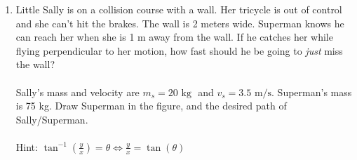 \documentclass[12pt]{report}
\newcommand{\kg}{\mbox{ kg }}
\begin{document}
\begin{enumerate}
\item Little Sally is on a collision course with a wall.  Her tricycle is out of control and she can't hit the brakes.  The wall is 2 meters wide.  Superman knows he can reach her when she is 1 m away from the wall.  If he catches her while flying perpendicular to her motion, how fast should he be going to \emph{just} miss the wall? \\ \\
Sally's mass and velocity are $m_s = 20\kg$ and $v_s = 3.5 \mbox{ m/s}$.  Superman's mass is 75 kg.  Draw Superman in the figure, and the desired path of Sally/Superman. \\ \\
Hint: $\tan^{-1}(\frac{y}{x}) = \theta \Longleftrightarrow \frac{y}{x} = \tan(\theta)$ \hfill{} 


\end{enumerate}
\end{document}
